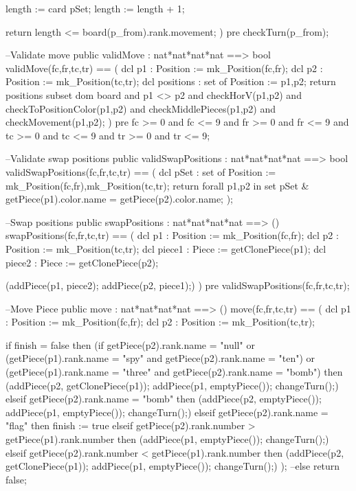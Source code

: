 \begin{vdm_al}
    length := card pSet;
    length := length + 1;
       
    return length <= board(p_from).rank.movement;
   )
   pre checkTurn(p_from);
  
  --Validate move
  public validMove : nat*nat*nat*nat ==> bool
   validMove(fc,fr,tc,tr) ==
   (
    dcl p1 : Position := mk_Position(fc,fr);
    dcl p2 : Position := mk_Position(tc,tr);
    dcl positions : set of Position := {p1,p2};
    return positions subset dom board and
     p1 <> p2 and
     checkHorV(p1,p2) and
     checkToPositionColor(p1,p2) and
     checkMiddlePieces(p1,p2) and
     checkMovement(p1,p2);
   )
   pre fc >= 0 and fc <= 9 and fr >= 0 and fr <= 9 and
     tc >= 0 and tc <= 9 and tr >= 0 and tr <= 9;
  
  --Validate swap positions
  public validSwapPositions : nat*nat*nat*nat ==> bool
   validSwapPositions(fc,fr,tc,tr) ==
   (
    dcl pSet : set of Position := {mk_Position(fc,fr),mk_Position(tc,tr)};
    return forall p1,p2 in set pSet & getPiece(p1).color.name = getPiece(p2).color.name;
   );
   
  --Swap positions
  public swapPositions : nat*nat*nat*nat ==> ()
   swapPositions(fc,fr,tc,tr) ==
   (
    dcl p1 : Position := mk_Position(fc,fr);
    dcl p2 : Position := mk_Position(tc,tr);
    dcl piece1 : Piece := getClonePiece(p1);
    dcl piece2 : Piece := getClonePiece(p2);
    
    (addPiece(p1, piece2);
    addPiece(p2, piece1);)
   )
   pre validSwapPositions(fc,fr,tc,tr);
     
  --Move Piece
  public move : nat*nat*nat*nat ==> ()
   move(fc,fr,tc,tr) ==
   (
    dcl p1 : Position := mk_Position(fc,fr);
    dcl p2 : Position := mk_Position(tc,tr);
    
    if finish = false
     then
     (if getPiece(p2).rank.name = "null" or
        (getPiece(p1).rank.name = "spy" and
       getPiece(p2).rank.name = "ten") or
       (getPiece(p1).rank.name = "three" and
       getPiece(p2).rank.name = "bomb")
      then (addPiece(p2, getClonePiece(p1));
         addPiece(p1, emptyPiece());
         changeTurn();)
     elseif getPiece(p2).rank.name = "bomb"
      then (addPiece(p2, emptyPiece());
         addPiece(p1, emptyPiece());
         changeTurn();)
     elseif getPiece(p2).rank.name = "flag"
      then finish := true
     elseif getPiece(p2).rank.number > getPiece(p1).rank.number
      then (addPiece(p1, emptyPiece());
        changeTurn();)
     elseif getPiece(p2).rank.number < getPiece(p1).rank.number
      then (addPiece(p2, getClonePiece(p1));
         addPiece(p1, emptyPiece());
         changeTurn();)
     );
    --else return false;
    

\end{vdm_al}
